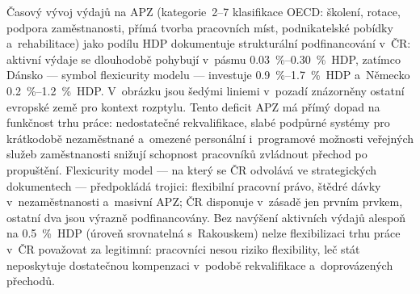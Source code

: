 Časový vývoj výdajů na \ac{APZ} (kategorie~2--7 klasifikace \acs{OECD}: školení, rotace, podpora zaměstnanosti, přímá tvorba pracovních míst, podnikatelské pobídky a~rehabilitace) jako podílu \ac{HDP} dokumentuje strukturální podfinancování v~ČR: aktivní výdaje se dlouhodobě pohybují v~pásmu \SIrange{0,03}{0,30}{\percent}~\ac{HDP}, zatímco Dánsko --- symbol flexicurity modelu --- investuje \SIrange{0,9}{1,7}{\percent}~\ac{HDP} a~Německo \SIrange{0,2}{1,2}{\percent}~\ac{HDP}.
V~obrázku jsou šedými liniemi v~pozadí znázorněny ostatní evropské země pro kontext rozptylu.
Tento deficit \ac{APZ} má přímý dopad na funkčnost trhu práce: nedostatečné rekvalifikace, slabé podpůrné systémy pro krátkodobě nezaměstnané a~omezené personální i~programové možnosti veřejných služeb zaměstnanosti snižují schopnost pracovníků zvládnout přechod po propuštění.
Flexicurity model --- na který se ČR odvolává ve strategických dokumentech --- předpokládá trojici: flexibilní pracovní právo, štědré dávky v~nezaměstnanosti a~masivní \ac{APZ}; ČR disponuje v~zásadě jen prvním prvkem, ostatní dva jsou výrazně podfinancovány.
Bez navýšení aktivních výdajů alespoň na \SI{0,5}{\percent}~\ac{HDP} (úroveň srovnatelná s~Rakouskem) nelze flexibilizaci trhu práce v~ČR považovat za legitimní: pracovníci nesou riziko flexibility, leč stát neposkytuje dostatečnou kompenzaci v~podobě rekvalifikace a~doprovázených přechodů.


